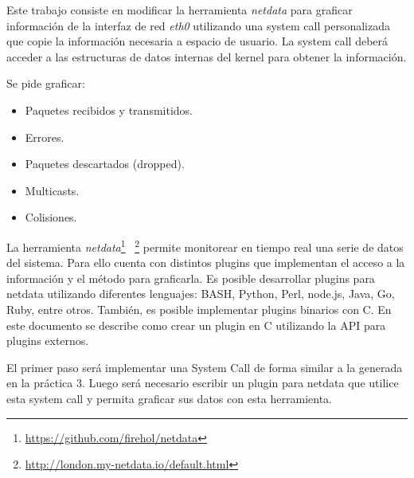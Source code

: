 Este trabajo consiste en modificar la herramienta \textit{netdata} para
graficar
información de la interfaz de red \textit{eth0} utilizando una system call
personalizada que copie la información necesaria a espacio de usuario.
La system call deberá acceder a las estructuras de datos internas del kernel
para obtener la información.

Se pide graficar:
\begin{itemize}
	\item Paquetes recibidos y transmitidos.
	\item Errores.
	\item Paquetes descartados (dropped).
	\item Multicasts.
	\item Colisiones.
\end{itemize}

La herramienta
\textit{netdata}\footnote{\url{https://github.com/firehol/netdata}}%
~\footnote{\url{http://london.my-netdata.io/default.html}}
permite monitorear en tiempo real una serie de datos del sistema. Para ello
cuenta con distintos plugins que implementan el acceso a la información y el
método para graficarla. Es posible desarrollar plugins para netdata utilizando
diferentes lenguajes: BASH, Python, Perl, node.js, Java, Go, Ruby, entre otros.
También, es posible implementar plugins binarios con C. En este documento se
describe como crear un plugin en C utilizando la API para plugins externos.

El primer paso será implementar una System Call de forma similar a la generada
en la práctica 3. Luego será necesario escribir un plugin para netdata que
utilice esta system call y permita graficar sus datos con esta herramienta.
